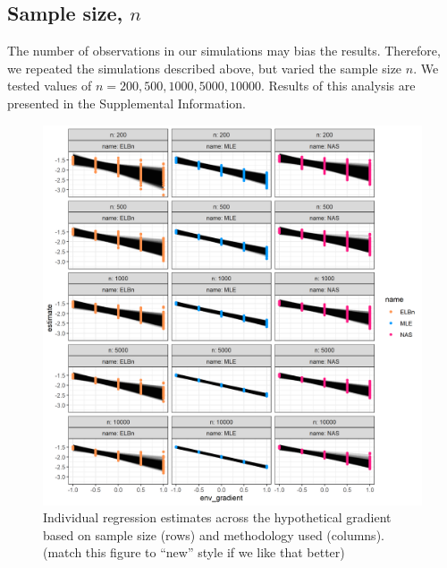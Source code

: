 \documentclass[
]{article}
\begin{document}
\newpage

\hypertarget{sample-size-n}{%
\subsection{\texorpdfstring{Sample size,
\(n\)}{Sample size, n}}\label{sample-size-n}}

The number of observations in our simulations may bias the results.
Therefore, we repeated the simulations described above, but varied the
sample size \(n\). We tested values of
\(n = 200, 500, 1000, 5000, 10 000\). Results of this analysis are
presented in the Supplemental Information.

\begin{figure}
\centering
\includegraphics{figures/n_vary_main.png}
\caption{Individual regression estimates across the hypothetical
gradient based on sample size (rows) and methodology used (columns).
(match this figure to ``new'' style if we like that better)}
\end{figure}
\end{document}
